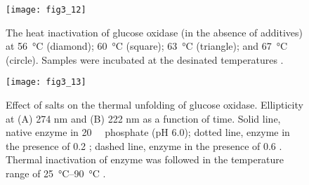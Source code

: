 \begin{refsection}
\begin{figure}[htbp] \centering \texttt{[image: fig3\_12]}
    \caption[The heat inactivation of glucose oxidase (in the absence of
        additives) at \SI{56}{\celsius} (diamond); \SI{60}{\celsius} (square);
        \SI{63}{\celsius} (triangle); and \SI{67}{\celsius} (circle). Samples
        were incubated at the desinated temperatures.]{The heat inactivation of
            glucose oxidase (in the absence of additives) at \SI{56}{\celsius}
            (diamond); \SI{60}{\celsius} (square); \SI{63}{\celsius}
            (triangle); and \SI{67}{\celsius} (circle). Samples were incubated
            at the desinated temperatures \cite{Gouda2003}.}
    \label{fig:heat-inactivation-exmaple}
\end{figure}
\begin{figure}[htbp] \centering \texttt{[image: fig3\_13]} 
    \caption[Effect of salts on the thermal unfolding of  glucose oxidase.
        Ellipticity at (A) 274 nm and (B) 222 nm as a function of time. Solid
        line, native enzyme in \SI{20}{\milli\Molar} phosphate (pH 6.0); dotted
        line, enzyme in the presence of \SI{0.2}{\Molar}  ; dashed
        line, enzyme in the presence of \SI{0.6}{\Molar} . Thermal
        inactivation of enzyme was followed in the temperature range of
    \SIrange{25}{90}{\celsius}.]{Effect of salts on the thermal unfolding of
        glucose oxidase. Ellipticity at (A) 274 nm and (B) 222 nm as a function
        of time. Solid line, native enzyme in \SI{20}{\milli\Molar} phosphate
        (pH 6.0); dotted line, enzyme in the presence of \SI{0.2}{\Molar}
         ; dashed line, enzyme in the presence of \SI{0.6}{\Molar}
        . Thermal inactivation of enzyme was followed in the
        temperature range of \SIrange{25}{90}{\celsius} \cite{Gouda2003}.}
    \label{fig:heat-inactivation-improve} 
\end{figure}


\end{refsection}
